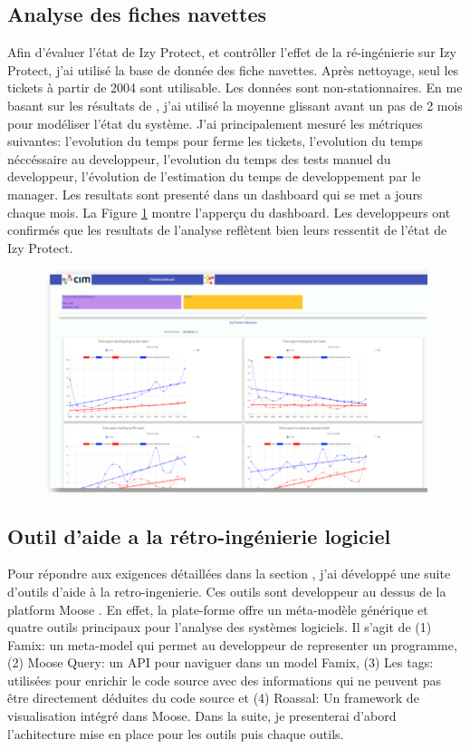 \documentclass[a4paper]{article}
\begin{document}
\subsection{Analyse des fiches navettes}
\label{sec:analyseDesFichesNavettes}
Afin d'évaluer l'état de Izy Protect, et contrôller l'effet de la ré-ingénierie sur Izy Protect,
 j'ai utilisé la base de donnée des fiche navettes. 
Après nettoyage, seul les tickets à partir de 2004 sont utilisable. 
Les données sont non-stationnaires. 
En me basant sur les résultats de \cite{Raja09}, j'ai utilisé la moyenne glissant avant un pas de 2 mois pour modéliser l'état du système.
J'ai principalement mesuré les métriques suivantes: l'evolution du temps pour ferme les tickets, l'evolution du temps néccéssaire au developpeur, l'evolution du temps des tests manuel du developpeur,
l'évolution de l'estimation du temps de developpement par le manager.
Les resultats sont presenté dans un dashboard qui se met a jours chaque mois.
La Figure \ref{dashboardFig} montre l'apperçu du dashboard.
Les developpeurs ont confirmés que les resultats de l'analyse reflètent bien leurs ressentit de l'état de Izy Protect. 

\begin{figure}[htbp]
  \centering
  \includegraphics[width=\textwidth]{./figures/dashboard.png}
  \label{dashboardFig}

\end{figure}


\subsection{Outil d'aide a la rétro-ingénierie logiciel}
Pour répondre aux exigences détaillées dans la section , j'ai développé une suite d'outils d'aide à la retro-ingenierie.
Ces outils sont developpeur au dessus de la platform Moose \cite{Nier05c}.
En effet, la plate-forme offre un méta-modèle générique et quatre outils principaux pour l'analyse des systèmes logiciels.
Il s'agit de (1) Famix: un meta-model qui permet au developpeur de representer un programme, (2) Moose Query: un API pour naviguer dans un model Famix,
(3) Les tags: utilisées pour enrichir le code source avec des informations qui ne peuvent pas être directement déduites du code source et 
(4) Roassal: Un framework de visualisation intégré dans Moose.
Dans la suite, je presenterai d'abord l'achitecture mise en place pour les outils puis  chaque outils.
\end{document}
